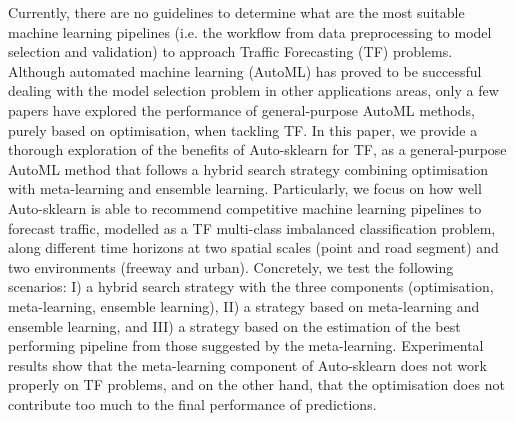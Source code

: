 
Currently, there are no guidelines to determine what are the most suitable machine learning pipelines (i.e. the workflow from data preprocessing to model selection and validation) to approach Traffic Forecasting (TF) problems. Although automated machine learning (AutoML) has proved to be successful dealing with the model selection problem in other applications areas, only a few papers have explored the performance of general-purpose AutoML methods, purely based on optimisation, when tackling TF. In this paper, we provide a thorough exploration of the benefits of Auto-sklearn for TF, as a general-purpose AutoML method that follows a hybrid search strategy combining optimisation with meta-learning and ensemble learning. Particularly, we focus on how well Auto-sklearn is able to recommend competitive machine learning pipelines to forecast traffic, modelled as a TF multi-class imbalanced classification problem, along different time horizons at two spatial scales (point and road segment) and two environments (freeway and urban). Concretely, we test the following scenarios: I) a hybrid search strategy with the three components (optimisation, meta-learning, ensemble learning), II) a strategy based on meta-learning and ensemble learning, and III) a strategy based on the estimation of the best performing pipeline from those suggested by the meta-learning. Experimental results show that the meta-learning component of Auto-sklearn does not work properly on TF problems, and on the other hand, that the optimisation does not contribute too much to the final performance of predictions.



